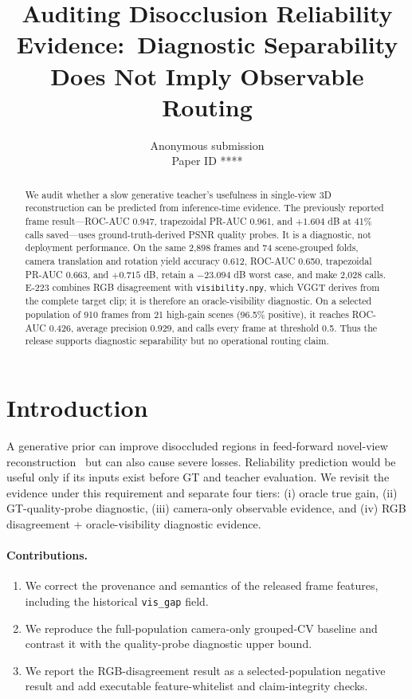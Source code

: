\documentclass[10pt,twocolumn,letterpaper]{article}
\title{Auditing Disocclusion Reliability Evidence:\ Diagnostic Separability Does Not Imply Observable Routing}
\author{Anonymous submission\\\small Paper ID ****}
\date{}
\begin{document}
\maketitle

\begin{abstract}
We audit whether a slow generative teacher's usefulness in single-view 3D
reconstruction can be predicted from inference-time evidence. The previously
reported frame result---ROC-AUC 0.947, trapezoidal PR-AUC 0.961, and
$+1.604$ dB at 41\% calls saved---uses ground-truth-derived PSNR quality probes.
It is a diagnostic, not deployment performance. On the same 2,898 frames and 74
scene-grouped folds, camera translation and rotation yield accuracy 0.612,
ROC-AUC 0.650, trapezoidal PR-AUC 0.663, and $+0.715$ dB, retain a $-23.094$ dB
worst case, and make 2,028 calls. E-223 combines RGB disagreement with
\texttt{visibility.npy}, which VGGT derives from the complete target clip; it is
therefore an oracle-visibility diagnostic. On a selected population of 910
frames from 21 high-gain scenes (96.5\% positive), it reaches ROC-AUC 0.426,
average precision 0.929, and calls every frame at threshold 0.5. Thus the release
supports diagnostic separability but no operational routing claim.
\end{abstract}

\section{Introduction}
A generative prior can improve disoccluded regions in feed-forward novel-view
reconstruction~\cite{flash3d} but can also cause severe losses. Reliability prediction would be useful only if its inputs exist before
GT and teacher evaluation. We revisit the evidence under this requirement and
separate four tiers: (i) oracle true gain, (ii) GT-quality-probe diagnostic,
(iii) camera-only observable evidence, and (iv) RGB disagreement +
oracle-visibility diagnostic evidence.

\paragraph{Contributions.}
\begin{enumerate}
\item We correct the provenance and semantics of the released frame features,
including the historical \texttt{vis\_gap} field.
\item We reproduce the full-population camera-only grouped-CV baseline and
contrast it with the quality-probe diagnostic upper bound.
\item We report the RGB-disagreement result as a selected-population negative
result and add executable feature-whitelist and claim-integrity checks.
\end{enumerate}
\end{document}
